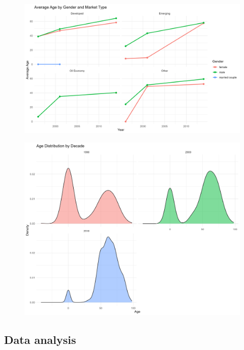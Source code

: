 \documentclass[
  man,floatsintext]{apa6}
\begin{document}
\begin{figure}
\includegraphics[width=0.9\linewidth]{../Question4/Results/age_trends_by_market_type} \caption{ }\label{fig:age-trends-market-image}
\end{figure}

\begin{figure}
\includegraphics[width=0.9\linewidth]{../Question4/Results/age_distribution_by_decade} \caption{ }\label{fig:age-distribution-decade-image}
\end{figure}

\subsection{Data analysis}\label{data-analysis}
\end{document}
